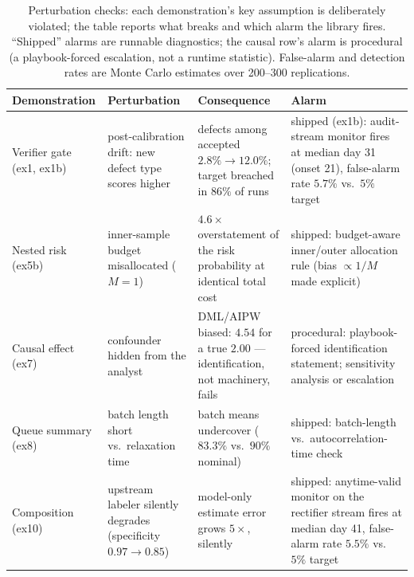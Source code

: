 \documentclass[11pt,a4paper]{article}
\begin{document}
\begin{table}[t]
\centering\small
\caption{Perturbation checks: each demonstration's key assumption is
deliberately violated; the table reports what breaks and which alarm the
library fires. ``Shipped'' alarms are runnable diagnostics; the causal
row's alarm is procedural (a playbook-forced escalation, not a runtime
statistic). False-alarm and detection rates are Monte Carlo estimates over
200--300 replications.}
\label{tab:perturb}
\begin{tabular}{@{}L{3.2cm}L{3.6cm}L{3.4cm}L{3.2cm}@{}}
\toprule
Demonstration & Perturbation & Consequence & Alarm \\
\midrule
Verifier gate (ex1, ex1b) & post-calibration drift: new defect type scores
higher & defects among accepted $2.8\%\to12.0\%$; target breached in
$86\%$ of runs & shipped (ex1b): audit-stream monitor fires at median
day 31 (onset 21), false-alarm rate $5.7\%$ vs.\ $5\%$ target \\
Nested risk (ex5b) & inner-sample budget misallocated ($M{=}1$) &
$4.6\times$ overstatement of the risk probability at identical total
cost & shipped: budget-aware inner/outer allocation rule (bias
$\propto 1/M$ made explicit) \\
Causal effect (ex7) & confounder hidden from the analyst & DML/AIPW
biased: $4.54$ for a true $2.00$ --- identification, not machinery,
fails & procedural: playbook-forced identification statement; sensitivity
analysis or escalation \\
Queue summary (ex8) & batch length short vs.\ relaxation time & batch
means undercover ($83.3\%$ vs.\ $90\%$ nominal) & shipped: batch-length
vs.\ autocorrelation-time check \\
Composition (ex10) & upstream labeler silently degrades
(specificity $0.97\to0.85$) & model-only estimate error grows $5\times$,
silently & shipped: anytime-valid monitor on the rectifier stream fires
at median day 41, false-alarm rate $5.5\%$ vs.\ $5\%$ target \\
\bottomrule
\end{tabular}
\end{table}
\end{document}
